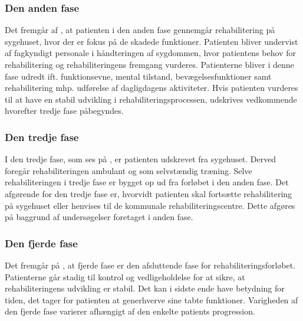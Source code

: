 \subsubsection{Den anden fase}
Det fremgår af , at patienten i den anden fase gennemgår rehabilitering på sygehuset, hvor der er fokus på de skadede funktioner. Patienten bliver undervist af fagkyndigt personale i håndteringen af sygdommen, hvor patientens behov for rehabilitering og rehabiliteringens fremgang vurderes. Patienterne bliver i denne fase udredt ift. funktionsevne, mental tilstand, bevægelsesfunktioner samt rehabilitering mhp. udførelse af dagligdagens aktiviteter. Hvis patienten vurderes til at have en stabil udvikling i rehabiliteringsprocessen, udskrives vedkommende hvorefter tredje fase påbegyndes. \cite{Sundhedsstyrelsen2011a}

\subsubsection{Den tredje fase}
I den tredje fase, som ses på , er patienten udskrevet fra sygehuset. Derved foregår rehabiliteringen ambulant og som selvstændig træning. Selve rehabiliteringen i tredje fase er bygget op ud fra forløbet i den anden fase. Det afgørende for den tredje fase er, hvorvidt patienten skal fortsætte rehabilitering på sygehuset eller henvises til de kommunale rehabiliteringscentre. Dette afgøres på baggrund af undersøgelser foretaget i anden fase. \cite{Sundhedsstyrelsen2011a}

\subsubsection{Den fjerde fase}
Det fremgår på , at fjerde fase er den afsluttende fase for rehabiliteringsforløbet. Patienterne går stadig til kontrol og vedligeholdelse for at sikre, at rehabiliteringens udvikling er stabil. Det kan i sidste ende have betydning for tiden, det tager for patienten at generhverve sine tabte funktioner. Varigheden af den fjerde fase varierer afhængigt af den enkelte patients progression. \cite{Sundhedsstyrelsen2011a} \\

